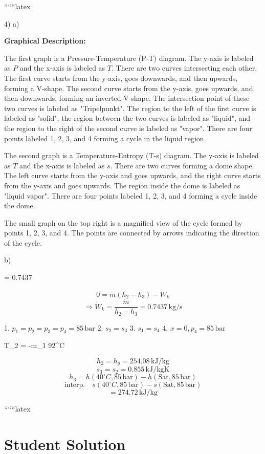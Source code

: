 
``````latex


4) a)

\textbf{Graphical Description:}

The first graph is a Pressure-Temperature (P-T) diagram. The y-axis is labeled as \( P \) and the x-axis is labeled as \( T \). There are two curves intersecting each other. The first curve starts from the y-axis, goes downwards, and then upwards, forming a V-shape. The second curve starts from the y-axis, goes upwards, and then downwards, forming an inverted V-shape. The intersection point of these two curves is labeled as "Tripelpunkt". The region to the left of the first curve is labeled as "solid", the region between the two curves is labeled as "liquid", and the region to the right of the second curve is labeled as "vapor". There are four points labeled 1, 2, 3, and 4 forming a cycle in the liquid region.

The second graph is a Temperature-Entropy (T-s) diagram. The y-axis is labeled as \( T \) and the x-axis is labeled as \( s \). There are two curves forming a dome shape. The left curve starts from the y-axis and goes upwards, and the right curve starts from the y-axis and goes upwards. The region inside the dome is labeled as "liquid vapor". There are four points labeled 1, 2, 3, and 4 forming a cycle inside the dome.

The small graph on the top right is a magnified view of the cycle formed by points 1, 2, 3, and 4. The points are connected by arrows indicating the direction of the cycle.

b)

  = 0.7437 \, 

\[
0 = \dot{m}(h_2 - h_3) - \dot{W}_k
\]
\[
\Rightarrow \dot{W}_k = \frac{\dot{m}}{h_2 - h_3} = 0.7437 \, \text{kg/s}
\]

1. \( p_1 = p_2 = p_3 = p_4 = 85 \, \text{bar} \)
2. \( s_2 = s_3 \)
3. \( s_1 = s_4 \)
4. \( x = 0, p_4 = 85 \, \text{bar} \)

 \quad T_2 = -m_1 92^\circ C \quad {}

\[
h_2 = h_g = 254.08 \, \text{kJ/kg}
\]
\[
s_3 = s_2 = 0.855 \, \text{kJ/kgK}
\]
\[
h_3 = h(40^\circ C, 85 \, \text{bar}) - h(\text{Sat}, 85 \, \text{bar})
\]
\[
\text{interp.} \quad s(40^\circ C, 85 \, \text{bar}) - s(\text{Sat}, 85 \, \text{bar})
\]
\[
= 274.72 \, \text{kJ/kg}
\]

``````latex


\section*{Student Solution}

